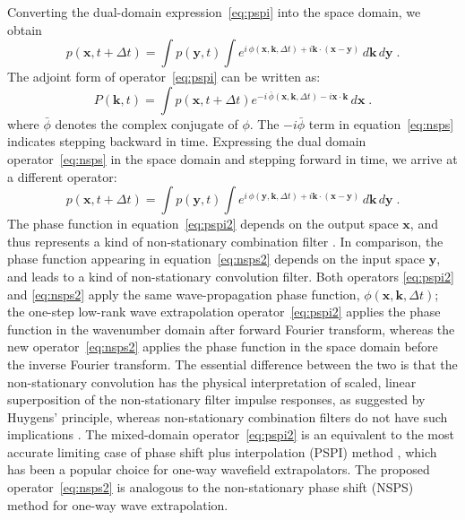 Converting the dual-domain expression~\ref{eq:pspi} into the space domain, we obtain
\begin{equation}
  \label{eq:pspi2}
  p(\mathbf{x},t+\Delta t) = \int p(\mathbf{y},t) \int e^{i\,\phi(\mathbf{x},\mathbf{k},\Delta t) + i\mathbf{k} \cdot \mathbf{(x-y)}}\,d\mathbf{k}\,d\mathbf{y}\;.
\end{equation}
The adjoint form of operator~\ref{eq:pspi} can be written as:
\begin{equation}
  \label{eq:nsps}
  P(\mathbf{k},t) = \int p(\mathbf{x},t+\Delta t) e^{-i\,\bar{\phi}(\mathbf{x},\mathbf{k},\Delta t) - i\mathbf{x} \cdot \mathbf{k}}\,d\mathbf{x}\;. 
\end{equation}
where $\bar{\phi}$ denotes the complex conjugate of $\phi$. The $-i\bar{\phi}$ term in equation~\ref{eq:nsps} indicates stepping backward in time. Expressing the dual domain operator~\ref{eq:nsps} in the space domain and stepping forward in time, we arrive at a different operator:
\begin{equation}
  \label{eq:nsps2}
  p(\mathbf{x},t+\Delta t) = \int p(\mathbf{y},t) \int e^{i\,\phi(\mathbf{y},\mathbf{k},\Delta t) + i\mathbf{k} \cdot \mathbf{(x-y)}}\,d\mathbf{k}\,d\mathbf{y}\;.
\end{equation}
The phase function in equation~\ref{eq:pspi2} depends on the output space $\mathbf{x}$, and thus represents a kind of non-stationary combination filter \cite[]{margrave98}. In comparison, the phase function appearing in equation~\ref{eq:nsps2} depends on the input space $\mathbf{y}$, and leads to a kind of non-stationary convolution filter. Both operators \ref{eq:pspi2} and \ref{eq:nsps2} apply the same wave-propagation phase function, $\phi(\mathbf{x},\mathbf{k},\Delta t)$; the one-step low-rank wave extrapolation operator~\ref{eq:pspi2} applies the phase function in the wavenumber domain after forward Fourier transform, whereas the new operator~\ref{eq:nsps2} applies the phase function in the space domain before the inverse Fourier transform. The essential difference between the two is that the non-stationary convolution has the physical interpretation of scaled, linear superposition of the non-stationary filter impulse responses, as suggested by Huygens' principle, whereas non-stationary combination filters do not have such implications \cite[]{margrave98}. The mixed-domain operator~\ref{eq:pspi2} is an equivalent to the most accurate limiting case of phase shift plus interpolation (PSPI) method \cite[]{gazdag84,kessinger}, which has been a popular choice for one-way wavefield extrapolators. The proposed operator~\ref{eq:nsps2} is analogous to the non-stationary phase shift (NSPS) method \cite[]{margrave98,margraveandferguson} for one-way wave extrapolation. 

